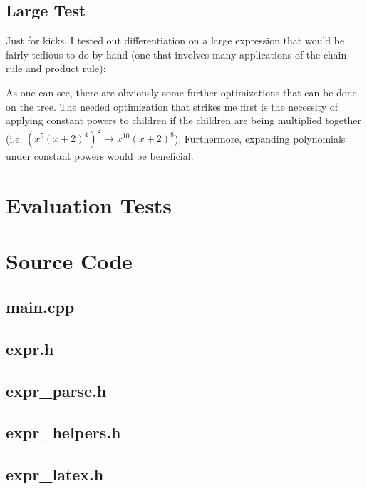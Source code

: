 \documentclass{article}
\def\qtreepadding{3pt}
\begin{document}
\clearpage
\subsection{Large Test}
Just for kicks, I tested out differentiation on a large expression that would be fairly tedious to do by hand (one that involves many applications of the chain rule and product rule):
\def\qtreepadding{1pt}
\begin{center}

\end{center}
As one can see, there are obviously some further optimizations that can be done on the tree. The needed optimization that strikes me first is the necessity of applying constant powers to children if the children are being multiplied together (i.e. $\left(x^5(x+2)^4\right)^2 \rightarrow x^{10}(x+2)^8$). Furthermore, expanding polynomials under constant powers would be beneficial. 

\section{Evaluation Tests}
\setlength{\mathindent}{0em}
\setlength{\abovedisplayskip}{-\baselineskip}
\setlength{\abovedisplayshortskip}{\abovedisplayskip}
\begin{multicols}{2}

\end{multicols}

\section{Source Code}
\subsection{main.cpp} \nopagebreak
\subsection{expr.h} \nopagebreak
\subsection{expr\_parse.h} \nopagebreak
\subsection{expr\_helpers.h} \nopagebreak
\subsection{expr\_latex.h} \nopagebreak
\end{document}
